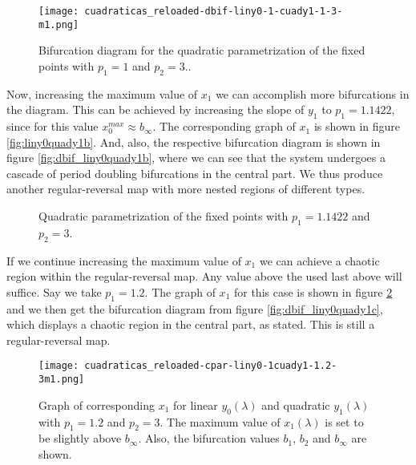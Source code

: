 \documentclass[10pt,twoside,titlepage]{book}
\numberwithin{equation}{chapter}
\numberwithin{figure}{chapter}
\numberwithin{table}{chapter}
\theoremstyle{plain}%
\theoremstyle{definition}
\theoremstyle{remark}
\begin{document}
\begin{figure}
	\centering
	\texttt{[image: cuadraticas\_reloaded-dbif-liny0-1-cuady1-1-3-m1.png]}
	\caption{Bifurcation diagram for the quadratic parametrization of the fixed points with $p_1=1$ and $p_2=3$..}
	\label{fig:dbif_liny0quady1}
\end{figure}

Now, increasing the maximum value of $x_1$ we can accomplish more bifurcations in the diagram. This can be achieved by increasing the slope of $y_1$ to $p_1=1.1422$, since for this value $x_0^{max}\approx b_{\infty}$. The corresponding graph of $x_1$ is shown in figure \ref{fig:liny0quady1b}. And, also, the respective bifurcation diagram is shown in figure \ref{fig:dbif_liny0quady1b}, where we can see that the system undergoes a cascade of period doubling bifurcations in the central part. We thus produce another regular-reversal map with more nested regions of different types.

\begin{figure}
	\centering
	\caption{Quadratic parametrization of the fixed points with $p_1=1.1422$ and $p_2=3$.}
\end{figure}

If we continue increasing the maximum value of $x_1$ we can achieve a chaotic region within the regular-reversal map. Any value above the used last above will suffice. Say we take $p_1=1.2$. The graph of $x_1$ for this case is shown in figure \ref{fig:liny0quady1c} and we then get the bifurcation diagram from figure \ref{fig:dbif_liny0quady1c}, which displays a chaotic region in the central part, as stated. This is still a regular-reversal map.

\begin{figure}
	\centering
	\texttt{[image: cuadraticas\_reloaded-cpar-liny0-1cuady1-1.2-3m1.png]}
	\caption{Graph of corresponding $x_1$ for linear $y_0(\lambda)$ and quadratic $y_1(\lambda)$ with $p_1=1.2$ and $p_2=3$. The maximum value of $x_1(\lambda)$ is set to be slightly above $b_{\infty}$. Also, the bifurcation values $b_1$, $b_2$ and $b_{\infty}$ are shown.}
	\label{fig:liny0quady1c}
\end{figure}
\end{document}
